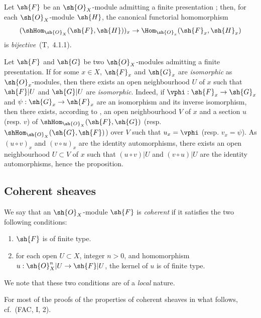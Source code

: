 \begin{env}[5.2.6]
\label{0.5.2.6}
Let $\sh{F}$ be an $\sh{O}_X$-module admitting a finite presentation ;
then, for each $\sh{O}_X$-module $\sh{H}$, the canonical functorial homomorphism
\[
  (\shHom_{\sh{O}_X}(\sh{F},\sh{H}))_x\to\Hom_{\sh{O}_x}(\sh{F}_x,\sh{H}_x)
\]
is \emph{bijective}~(T,~4.1.1).
\end{env}

\begin{env}[5.2.7]
\label{0.5.2.7}
Let $\sh{F}$ and $\sh{G}$ be two $\sh{O}_X$-modules admitting a finite presentation.
If for some $x\in X$, $\sh{F}_x$ and $\sh{G}_x$ are \emph{isomorphic} as $\sh{O}_x$-modules, then there exists an open neighbourhood $U$ of $x$ such that $\sh{F}|U$ and $\sh{G}|U$ are \emph{isomorphic}.
Indeed, if $\vphi:\sh{F}_x\to\sh{G}_x$ and $\psi:\sh{G}_x\to\sh{F}_x$ are an isomorphism and its inverse isomorphism, then there exists, according to , an open neighbourhood $V$ of $x$ and a section $u$ (resp. $v$) of $\shHom_{\sh{O}_X}(\sh{F},\sh{G})$ (resp. $\shHom_{\sh{O}_X}(\sh{G},\sh{F})$) over $V$ such
that $u_x=\vphi$ (resp. $v_x=\psi$).
As $(u\circ v)_x$ and $(v\circ u)_x$ are the identity automorphisms, there exists an open neighbourhood $U\subset V$ of $x$ such that $(u\circ v)|U$ and $(v\circ u)|U$ are the identity automorphisms, hence the proposition.
\end{env}

\subsection{Coherent sheaves}
\label{subsection:0.5.3}

\begin{env}[5.3.1]
\label{0.5.3.1}
We say that an $\sh{O}_X$-module $\sh{F}$ is \emph{coherent} if it satisfies the two following conditions:
\begin{enumerate}
  \item[(a)] $\sh{F}$ is of finite type.
  \item[(b)] for each open $U\subset X$, integer $n>0$, and homomorphism $u:\sh{O}_X^n|U\to\sh{F}|U$, the kernel of $u$ is of finite type.
\end{enumerate}
We note that these two conditions are of a \emph{local} nature.

For most of the proofs of the properties of coherent sheaves in what follows, cf.~(FAC, I, 2).
\end{env}

